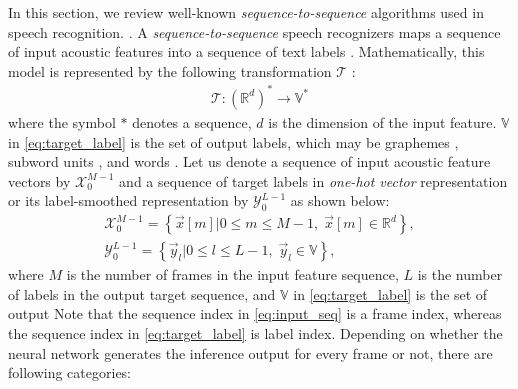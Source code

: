 \documentclass{article}
\begin{document}
In this section, we review well-known {\it sequence-to-sequence} algorithms
used in speech recognition.
\cite{
j_chorowski_nips_2015_00, 
a_graves_corr_2012_00, 
y_he_icassp_2019_00,
r_prabhavalkar_interspeech_2017_00}. 
A {\it sequence-to-sequence}
speech recognizers maps a sequence of input acoustic features into a sequence 
of text labels  \cite{r_prabhavalkar_interspeech_2017_00}. 
Mathematically, this model is 
represented by the following transformation $\mathcal{T}$ 
\cite{a_graves_icml_2006_00}:
\begin{align}
  \mathcal{T} : \left(\mathbb{R}^d\right)^{*} \rightarrow \mathbb{V}^{*}
	\label{eq:transformation}
\end{align}
where the symbol ${*}$ denotes a sequence, $d$ is the dimension of the input 
feature. $\mathbb{V}$ in \eqref{eq:target_label} is the set of output
labels, which may be graphemes 
\cite{j_chorowski_nips_2015_00,
w_chan_icassp_2016_00},
subword units \cite{
a_zeyer_interspeech_2018_00,
c_chiu_icassp_2018_00},
 and words \cite{h_soltau_interspeech_2017_00}.
Let us denote a sequence of input acoustic feature vectors by 
$\mathcal{X}_{0}^{M-1}$ and a sequence of target labels in 
{\it one-hot vector} representation or its label-smoothed 
representation \cite{} by 
$\mathcal{Y}_{0}^{L-1}$ as shown below:
\begin{subequations}
  \begin{align}
    \mathcal{X}_{0}^{M-1}  =  
      \left\{\vec{x}[m]
          \Big| 0 \le m \le M - 1, \; \vec{x}[m] \in \mathbb{R}^d \right\},  
    \label{eq:input_seq} \\
    \mathcal{Y}_{0}^{L-1}  =  
      \left\{\vec{y}_l  \Big| 0 \le l \le L-1, \; \vec{y}_l \in \mathbb{V} \right\}, 
    \label{eq:target_label}
  \end{align}
\end{subequations}
where $M$ is the number of frames in the input feature sequence,
$L$ is the number of labels in the output target sequence,
 and $\mathbb{V}$ in \eqref{eq:target_label} is the set of output
Note that the sequence index in \eqref{eq:input_seq} is a frame
index, whereas the sequence index in \eqref{eq:target_label} is 
label index. Depending on whether the neural network generates
the inference output for every frame or not, there are following
categories:
\end{document}
